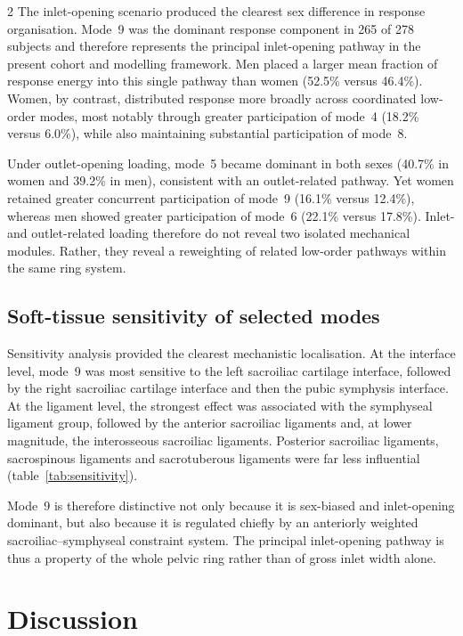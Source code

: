 \documentclass[openacc]{rsproca_new}
\begin{document}
\begin{multicols}{2}
The inlet-opening scenario produced the clearest sex difference in response organisation. Mode~9 was the dominant response component in 265 of 278 subjects and therefore represents the principal inlet-opening pathway in the present cohort and modelling framework. Men placed a larger mean fraction of response energy into this single pathway than women (52.5\% versus 46.4\%). Women, by contrast, distributed response more broadly across coordinated low-order modes, most notably through greater participation of mode~4 (18.2\% versus 6.0\%), while also maintaining substantial participation of mode~8.

Under outlet-opening loading, mode~5 became dominant in both sexes (40.7\% in women and 39.2\% in men), consistent with an outlet-related pathway. Yet women retained greater concurrent participation of mode~9 (16.1\% versus 12.4\%), whereas men showed greater participation of mode~6 (22.1\% versus 17.8\%). Inlet- and outlet-related loading therefore do not reveal two isolated mechanical modules. Rather, they reveal a reweighting of related low-order pathways within the same ring system.

\subsection{Soft-tissue sensitivity of selected modes}

Sensitivity analysis provided the clearest mechanistic localisation. At the interface level, mode~9 was most sensitive to the left sacroiliac cartilage interface, followed by the right sacroiliac cartilage interface and then the pubic symphysis interface. At the ligament level, the strongest effect was associated with the symphyseal ligament group, followed by the anterior sacroiliac ligaments and, at lower magnitude, the interosseous sacroiliac ligaments. Posterior sacroiliac ligaments, sacrospinous ligaments and sacrotuberous ligaments were far less influential (table~\ref{tab:sensitivity}).

Mode~9 is therefore distinctive not only because it is sex-biased and inlet-opening dominant, but also because it is regulated chiefly by an anteriorly weighted sacroiliac--symphyseal constraint system. The principal inlet-opening pathway is thus a property of the whole pelvic ring rather than of gross inlet width alone.

\section{Discussion}


\end{multicols}
\end{document}
